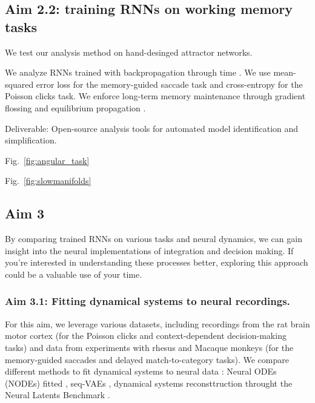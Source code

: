 \documentclass[12pt,letterpaper, onecolumn]{article}
\theoremstyle{definition}
\theoremstyle{remark}
\begin{document}
%
\subsection*{Aim 2.2: training RNNs on working memory tasks}

We test our analysis method on hand-desinged attractor networks.

We analyze RNNs trained with backpropagation through time \citep{farrell2022, schuessler2020}.
We use mean-squared error loss for the memory-guided saccade task and cross-entropy for the Poisson clicks task.
We enforce  long-term  memory maintenance through gradient flossing \citep{engelken2023b} and equilibrium propagation \citep{laborieux2023}.



Deliverable: Open-source analysis tools for automated model identification and simplification.



Fig.~\ref{fig:angular_task}

Fig.~\ref{fig:slowmanifolds}






\newpage

\subsection*{Aim 3}

By comparing trained RNNs on various tasks and neural dynamics, we can gain insight into the neural implementations of integration and decision making. If you're interested in understanding these processes better, exploring this approach could be a valuable use of your time.


\subsubsection*{Aim 3.1: Fitting dynamical systems to neural recordings.}

For this aim, we leverage various datasets, including recordings from the rat brain motor cortex (for the Poisson clicks and context-dependent decision-making tasks) and data from experiments with rhesus and Macaque monkeys (for the memory-guided saccades and delayed match-to-category tasks).
%
We compare different methods to fit dynamical systems to neural data \citep{Zhao2016d}:
 Neural ODEs (NODEs) fitted \citep{kim2021inferring},
 seq-VAEs \citep{pandarinath2018inferring},
dynamical systems reconsttruction \citep{schmidt2019} throught the Neural Latents Benchmark \citep{pei2021neural}.
%
\end{document}
